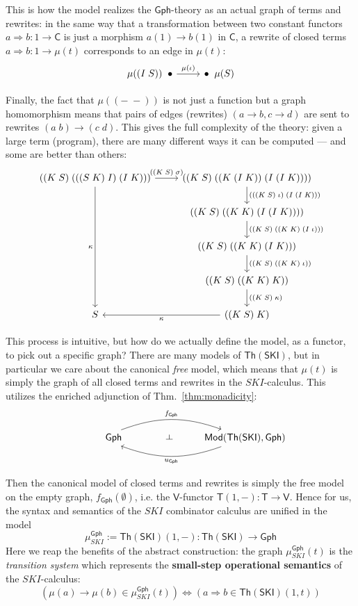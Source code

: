 \documentclass{amsart}
\theoremstyle{definition}
\def\ld{\rotatebox[origin=c]{-90}{$\dashv$}} %
\newcommand{\Th}{\mathsf{Th}}
\newcommand{\Gph}{\mathsf{Gph}}
\newcommand{\Mod}{\mathsf{Mod}}
\newcommand{\V}{\mathsf{V}}
\newcommand{\C}{\mathsf{C}}
\newcommand{\T}{\mathsf{T}}
\newcommand{\maps}{\colon}
\begin{document}
This is how the model realizes the $\Gph$-theory as an actual graph of terms and rewrites: in the same way that a transformation between two constant functors $a\Rightarrow b\maps 1\to \C$ is just a morphism $a(1)\to b(1)$ in $\C$, a rewrite of closed terms $a\Rightarrow b\maps 1\to \mu(t)$ corresponds to an edge in $\mu(t)$:
\[\begin{tikzcd}
	\mu((I\; S)) \;\; \bullet \arrow[r,"\mu(\iota)"] & \bullet \;\; \mu(S)
\end{tikzcd}\]

Finally, the fact that $\mu((-\;-))$ is not just a function but a graph homomorphism means that pairs of edges (rewrites) $(a\to b, c\to d)$ are sent to rewrites $(a\; b) \to (c\; d)$. This gives the full complexity of the theory: given a large term (program), there are many different ways it can be computed --- and some are better than others:
\[\begin{tikzcd}
	((K\; S)\; (((S\; K)\; I)\; (I\; K))) \arrow[r,"((K\; S)\; \sigma)"] \arrow[dddd,swap,"\kappa"] & ((K\; S)\; ((K\;(I\; K))\; (I\; (I\; K)))) \arrow[d,"(((K\; S)\; \iota)\; (I\; (I\; K)))"]\\
	& ((K\; S)\; ((K\; K)\; (I\; (I\; K)))) \arrow[d,"((K\; S)\; ((K\; K)\; (I\; \iota)))"]\\
	& ((K\; S)\; ((K\; K)\; (I\; K))) \arrow[d,"((K\; S)\; ((K\; K)\; \iota))"]\\
	& ((K\; S)\; ((K\; K)\; K)) \arrow[d,"((K\; S)\; \kappa)"]\\
	S & ((K\; S)\; K)\arrow[l,"\kappa"]
\end{tikzcd}\]

This process is intuitive, but how do we actually define the model, as a functor, to pick out a specific graph? There are many models of $\Th(\mathsf{SKI})$, but in particular we care about the canonical \textit{free} model, which means that $\mu(t)$ is simply the graph of all closed terms and rewrites in the $SKI$-calculus. This utilizes the enriched adjunction of Thm.\ \ref{thm:monadicity}:
\[\begin{tikzcd}
\phantom{AAAA} \Gph \arrow[bend left=20,"f_\Gph"]{rr}
& {\phantom{Aa} \ld} &
\arrow[bend left=20,"u_\Gph"]{ll} \Mod(\Th(\mathsf{SKI}),\Gph)
\end{tikzcd}\]

Then the canonical model of closed terms and rewrites is simply the free model on the empty graph, $f_\Gph(\emptyset)$, i.e. the $\V$-functor $\T(1,-)\maps\T\to \V$. Hence for us, the syntax and semantics of the $SKI$ combinator calculus are unified in the model $$\mu_{SKI}^\Gph:= \Th(\mathsf{SKI})(1,-)\maps \Th(\mathsf{SKI}) \to \Gph$$ Here we reap the benefits of the abstract construction: the graph $\mu_{SKI}^\Gph(t)$ is the \textit{transition system} which represents the \textbf{small-step operational semantics} of the $SKI$-calculus: $$(\mu(a) \to \mu(b) \in \mu_{SKI}^\Gph(t)) \iff (a \Rightarrow b \in \Th(\mathsf{SKI})(1,t))$$
\end{document}
